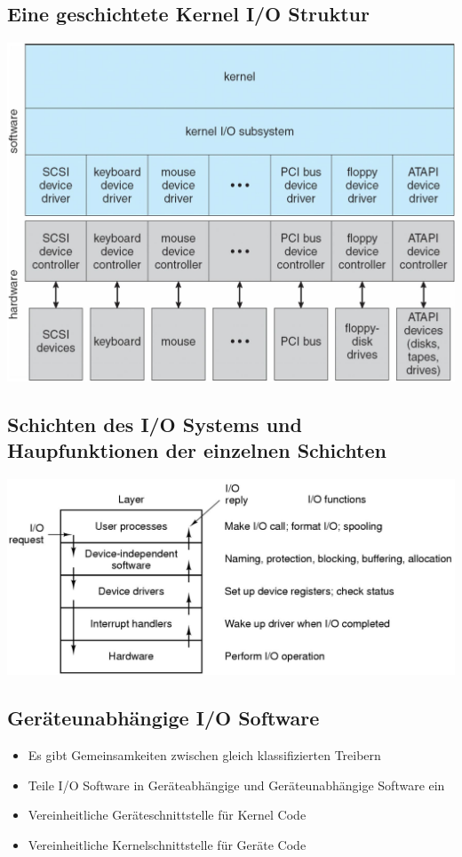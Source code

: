 \documentclass[a4paper]{scrreprt}
\begin{document}
\subsection{Eine geschichtete Kernel I/O Struktur}
	\includegraphics[scale=0.34]{graphics/chapter9_8.png}
\subsection{Schichten des I/O Systems und Haupfunktionen der einzelnen Schichten}
	\includegraphics[scale=0.26]{graphics/chapter9_9.png}
\subsection{Geräteunabhängige I/O Software}
	\begin{itemize}
		\item Es gibt Gemeinsamkeiten zwischen gleich klassifizierten Treibern
		\item Teile I/O Software in Geräteabhängige und Geräteunabhängige Software ein
		\item Vereinheitliche Geräteschnittstelle für Kernel Code
		\item Vereinheitliche Kernelschnittstelle für Geräte Code
	\end{itemize}
\end{document}
